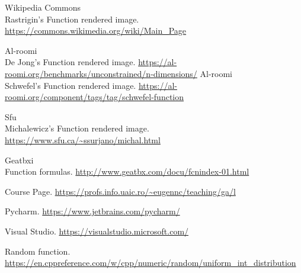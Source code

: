 \documentclass{report}
\begin{document}
\begin{thebibliography}{9}

  Wikipedia Commons \\ Rastrigin's Function rendered image.
  \url{https://commons.wikimedia.org/wiki/Main_Page}

  Al-roomi  \\ De Jong's Function rendered image.
  \url{https://al-roomi.org/benchmarks/unconstrained/n-dimensions/}
  Al-roomi  \\ Schwefel's Function rendered image.
  \url{https://al-roomi.org/component/tags/tag/schwefel-function}

   Sfu \\ Michalewicz's Function rendered image.  
\url{https://www.sfu.ca/~ssurjano/michal.html}


  Geatbxi  \\ Function formulas.
  \url{http://www.geatbx.com/docu/fcnindex-01.html}

  Course Page.
  \url{https://profs.info.uaic.ro/~eugennc/teaching/ga/l}

  Pycharm.
  \url{https://www.jetbrains.com/pycharm/}

  Visual Studio.
  \url{https://visualstudio.microsoft.com/}

  Random function.
  \url{https://en.cppreference.com/w/cpp/numeric/random/uniform_int_distribution}

\end{thebibliography}  
\end{document}
